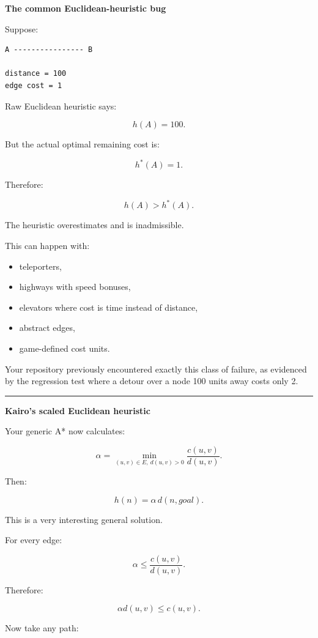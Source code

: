 \textbf{The common Euclidean-heuristic bug}

Suppose:

\begin{verbatim}
A ---------------- B

distance = 100
edge cost = 1
\end{verbatim}

Raw Euclidean heuristic says:

\[
h(A)=100.
\]

But the actual optimal remaining cost is:

\[
h^*(A)=1.
\]

Therefore:

\[
h(A)>h^*(A).
\]

The heuristic overestimates and is inadmissible.

This can happen with:

\begin{itemize}
\tightlist
\item
  teleporters,
\item
  highways with speed bonuses,
\item
  elevators where cost is time instead of distance,
\item
  abstract edges,
\item
  game-defined cost units.
\end{itemize}

Your repository previously encountered exactly this class of failure, as evidenced by the regression test where a detour over a node 100 units away costs only 2.

\begin{center}\rule{0.5\linewidth}{0.5pt}\end{center}

\textbf{Kairo's scaled Euclidean heuristic}

Your generic A* now calculates:

\[
\alpha=
\min_{(u,v)\in E,\ d(u,v)>0}
\frac{c(u,v)}{d(u,v)}.
\]

Then:

\[
\boxed{
h(n)=
\alpha\,d(n,goal).
}
\]

This is a very interesting general solution.

For every edge:

\[
\alpha
\le
\frac{c(u,v)}{d(u,v)}.
\]

Therefore:

\[
\alpha d(u,v)
\le
c(u,v).
\]

Now take any path:

